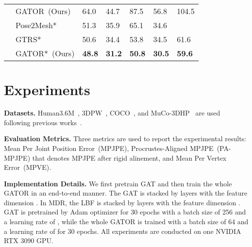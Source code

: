 \documentclass{article}
\begin{document}
\begin{table}[t]
{\begin{tabular}{L{2mm}L{20mm}|C{9.5mm}C{14mm}|C{9.5mm}C{14mm}C{9mm}}
    & GATOR~(Ours) & 64.0 & 44.7 & 87.5 & 56.8 & 104.5 \\
    & Pose2Mesh*~\cite{choi2020pose2mesh}   &  51.3  &  35.9  &  65.1  &  34.6 &   \\
    & GTRS*~\cite{zheng2021lightweight} &  50.6  &  34.4 &  53.8  &  34.5 & 61.6 \\
& GATOR*~(Ours) & \textbf{48.8} & \textbf{31.2} & \textbf{50.8} & \textbf{30.5} & \textbf{59.6}\\
    \hline
\end{tabular}}
\vspace{-3mm}
\end{table}

\vspace{-1mm}
\section{Experiments}\label{sec:experiments}
\vspace{-1mm}

\noindent \textbf{Datasets.} Human3.6M~\cite{ionescu2013human3}, 3DPW~\cite{von2018recovering}, COCO~\cite{lin2014microsoft}, and MuCo-3DHP~\cite{mehta2018single} are used following previous works~\cite{choi2020pose2mesh, pqgcn, zheng2021lightweight}. 

\noindent \textbf{Evaluation Metrics.} Three metrics are used to report the experimental results: Mean Per Joint Position Error~(MPJPE), Procrustes-Aligned MPJPE~(PA-MPJPE) that denotes MPJPE after rigid alinement, and Mean Per Vertex Error~(MPVE). 


\noindent \textbf{Implementation Details.} We first pretrain GAT and then train the whole GATOR in an end-to-end manner. The GAT is stacked by  layers with the feature dimension . In MDR, the LBF is stacked by  layers with the feature dimension . GAT is pretrained by Adam optimizer for 30 epochs with a batch size of 256 and a learning rate of , while the whole GATOR is trained with a batch size of 64 and a learning rate of  for 30 epochs. All experiments are conducted on one NVIDIA RTX 3090 GPU.
\end{document}
